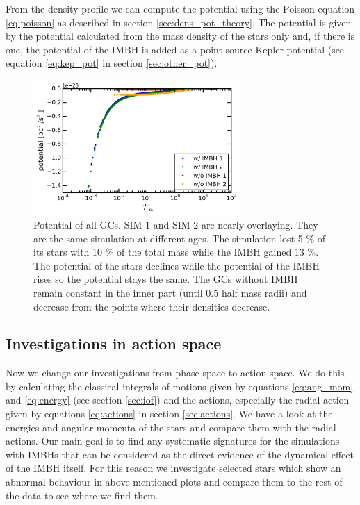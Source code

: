 \par From the density profile we can compute the potential using the Poisson equation \eqref{eq:poisson} as described in section \ref{sec:dens_pot_theory}. The potential is given by the potential calculated from the mass density of the stars only and, if there is one, the potential of the \ac{IMBH} is added as a point source Kepler potential (see equation \eqref{eq:kep_pot} in section \ref{sec:other_pot}).
\begin{figure}[htbp]
	\centering
	\includegraphics[width=0.7\textwidth]{Plots/potential.png}
	\caption{Potential of all \acp{GC}. SIM 1 and SIM 2 are nearly overlaying. They are the same simulation at different ages. The simulation lost 5 \% of its stars with 10 \% of the total mass while the \ac{IMBH} gained 13 \%. The potential of the stars declines while the potential of the \ac{IMBH} rises so the potential stays the same. The \acp{GC} without \ac{IMBH} remain constant in the inner part (until 0.5 half mass radii) and decrease from the points where their densities decrease.}
\end{figure}


\subsection{Investigations in action space}\label{sec:action_space}
Now we change our investigations from phase space to action space. We do this by calculating the classical integrals of motions given by equations \eqref{eq:ang_mom} and \eqref{eq:energy} (see section \ref{sec:iof}) and the actions, especially the radial action given by equations \eqref{eq:actions} in section \ref{sec:actions}. We have a look at the energies and angular momenta of the stars and compare them with the radial actions. Our main goal is to find any systematic signatures for the simulations with \acp{IMBH} that can be considered as the direct evidence of the dynamical effect of the \ac{IMBH} itself. For this reason we investigate selected stars which show an abnormal behaviour in above-mentioned plots and compare them to the rest of the data to see where we find them.
